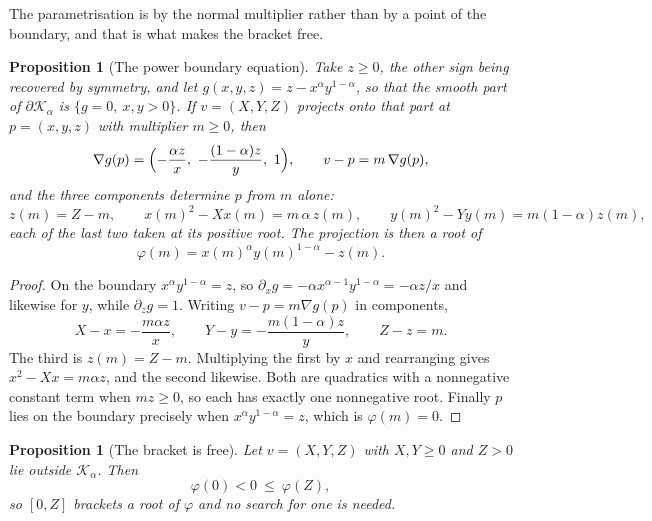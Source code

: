 \documentclass[a4paper,11pt]{book}
\theoremstyle{plain}
\newtheorem{proposition}[theorem]{Proposition}
\theoremstyle{definition}
\theoremstyle{remark}
\numberwithin{equation}{chapter}
\numberwithin{algorithm}{chapter}
\newcommand{\Kpow}{\mathcal{K}_{\alpha}}
\begin{document}
	The parametrisation is by the normal multiplier rather than by a point of the
	boundary, and that is what makes the bracket free.

	\begin{proposition}[The power boundary equation]\label{prop:powbound}
		Take $z\geq0$, the other sign being recovered by symmetry, and let
		$g(x,y,z)=z-x^{\alpha}y^{1-\alpha}$, so that the smooth part of
		$\partial\Kpow$ is $\{g=0,\ x,y>0\}$. If $v=(X,Y,Z)$ projects onto that
		part at $p=(x,y,z)$ with multiplier $m\geq0$, then
		\begin{equation}
			\nabla g(p)=\Bigl(-\frac{\alpha z}{x},\ -\frac{(1-\alpha)z}{y},\ 1\Bigr),
			\qquad
			v-p=m\,\nabla g(p) ,
		\end{equation}
		and the three components determine $p$ from $m$ alone:
		\begin{equation}\label{eq:powfrom}
			z(m)=Z-m,
			\qquad
			x(m)^{2}-Xx(m)=m\,\alpha\,z(m),
			\qquad
			y(m)^{2}-Yy(m)=m(1-\alpha)z(m) ,
		\end{equation}
		each of the last two taken at its positive root. The projection is then a
		root of
		\begin{equation}\label{eq:powphi}
			\varphi(m)=x(m)^{\alpha}y(m)^{1-\alpha}-z(m) .
		\end{equation}
	\end{proposition}

	\begin{proof}
		On the boundary $x^{\alpha}y^{1-\alpha}=z$, so
		$\partial_xg=-\alpha x^{\alpha-1}y^{1-\alpha}=-\alpha z/x$ and likewise for
		$y$, while $\partial_zg=1$. Writing $v-p=m\nabla g(p)$ in components,
		\[
		X-x=-\frac{m\alpha z}{x},
		\qquad
		Y-y=-\frac{m(1-\alpha)z}{y},
		\qquad
		Z-z=m .
		\]
		The third is $z(m)=Z-m$. Multiplying the first by $x$ and rearranging gives
		$x^{2}-Xx=m\alpha z$, and the second likewise. Both are quadratics with a
		nonnegative constant term when $mz\geq0$, so each has exactly one
		nonnegative root. Finally $p$ lies on the boundary precisely when
		$x^{\alpha}y^{1-\alpha}=z$, which is $\varphi(m)=0$.
	\end{proof}

	\begin{proposition}[The bracket is free]\label{prop:powbracket}
		Let $v=(X,Y,Z)$ with $X,Y\geq0$ and $Z>0$ lie outside $\Kpow$. Then
		\begin{equation}
			\varphi(0)<0\ \leq\ \varphi(Z) ,
		\end{equation}
		so $[0,Z]$ brackets a root of $\varphi$ and no search for one is needed.
	\end{proposition}
\end{document}
